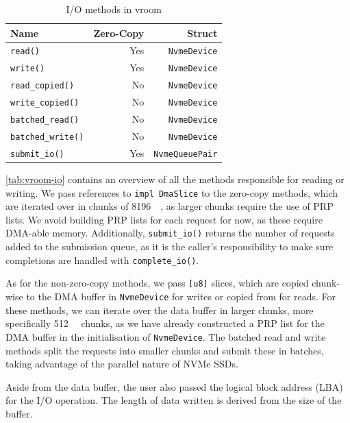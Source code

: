 \begin{table}[H]
    \centering
    \begin{tabular}{lrr}
        \textbf{Name} & \textbf{Zero-Copy} & \textbf{Struct} \\
        \toprule
        \texttt{read()} & Yes & \texttt{NvmeDevice} \\ \hline
        \texttt{write()} & Yes & \texttt{NvmeDevice} \\ \hline
        \texttt{read\_copied()} & No & \texttt{NvmeDevice} \\ \hline
        \texttt{write\_copied()} & No & \texttt{NvmeDevice} \\ \hline
        \texttt{batched\_read()} & No & \texttt{NvmeDevice} \\ \hline
        \texttt{batched\_write()} & No & \texttt{NvmeDevice} \\ \hline
        \midrule
        \texttt{submit\_io()} & Yes & \texttt{NvmeQueuePair} \\ \hline
        \bottomrule
    \end{tabular}
    \caption{I/O methods in vroom}
    \label{tab:vroom-io}
\end{table}

\autoref{tab:vroom-io} contains an overview of all the methods responsible for reading or writing. We pass references to \texttt{impl DmaSlice} to the zero-copy methods, which are iterated over in chunks of \qty{8196}{\kibi\byte}, as larger chunks require the use of PRP lists. We avoid building PRP lists for each request for now, as these require DMA-able memory. Additionally, \texttt{submit\_io()} returns the number of requests added to the submission queue, as it is the caller's responsibility to make sure completions are handled with \texttt{complete\_io()}.

As for the non-zero-copy methods, we pass \texttt{[u8]} slices, which are copied chunk-wise to the DMA buffer in \texttt{NvmeDevice} for writes or copied from for reads. For these methods, we can iterate over the data buffer in larger chunks, more specifically \qty{512}{\kibi\byte} chunks, as we have already constructed a PRP list for the DMA buffer in the initialisation of \texttt{NvmeDevice}. The batched read and write methods split the requests into smaller chunks and submit these in batches, taking advantage of the parallel nature of NVMe SSDs.

Aside from the data buffer, the user also passed the logical block address (LBA) for the I/O operation. The length of data written is derived from the size of the buffer.
